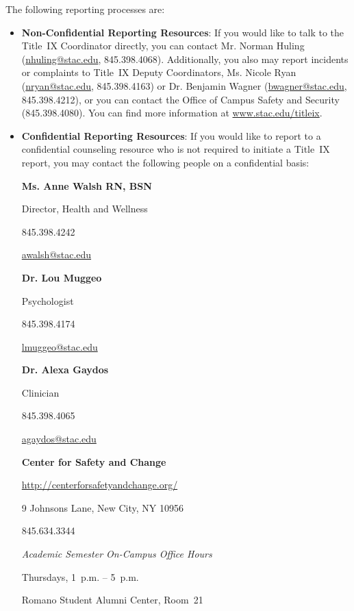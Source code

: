 \documentclass[11pt,letterpaper]{article}
\begin{document}
The following reporting processes are:
	\begin{itemize}
	\item {\bfseries Non-Confidential Reporting Resources}: If you would like to talk to the Title~IX Coordinator directly, you can contact Mr. Norman Huling (\href{mailto:nhuling@stac.edu}{nhuling@stac.edu}, 845.398.4068). Additionally, you also may report incidents or complaints to Title~IX Deputy Coordinators, Ms. Nicole Ryan (\href{mailto:nryan@stac.edu}{nryan@stac.edu}, 845.398.4163) or Dr. Benjamin Wagner (\href{mailto:bwagner@stac.edu}{bwagner@stac.edu}, 845.398.4212), or you can contact the Office of Campus Safety and Security (845.398.4080). You can find more information at \url{www.stac.edu/titleix}.
	
	\item {\bfseries Confidential Reporting Resources}: If you would like to report  to a confidential counseling resource who is not required to initiate a Title~IX report, you may contact the following people on a confidential basis: 
	
	\hspace{0.30cm}\begin{minipage}[t]{0.41\textwidth}
	{\bfseries Ms. Anne Walsh RN, BSN} \par
	Director, Health and Wellness \par
	845.398.4242 \par
	\href{mailto:awalsh@stac.edu}{awalsh@stac.edu}
	\end{minipage}\begin{minipage}[t]{0.30\textwidth}
	{\bfseries Dr. Lou Muggeo} \par
	Psychologist \par
	845.398.4174 \par
	\href{mailto:lmuggeo@stac.edu}{lmuggeo@stac.edu}
        \end{minipage}\begin{minipage}[t]{0.30\textwidth} 
 	{\bfseries Dr. Alexa Gaydos} \par
	Clinician \par
	845.398.4065 \par
	\href{mailto:agaydos@stac.edu}{agaydos@stac.edu}
        \end{minipage} 
        
        \begin{center}
        \begin{minipage}[t]{0.45\textwidth} 
	{\bfseries Center for Safety and Change} \par
	\url{http://centerforsafetyandchange.org/} \par
	9 Johnsons Lane, New City, NY 10956 \par
	845.634.3344 \par \vspace{0.2cm}
	{\itshape Academic Semester On-Campus Office Hours} \par
	Thursdays, 1~p.m. -- 5~p.m. \par
	Romano Student Alumni Center, Room~21
        \end{minipage} 
        \end{center}
\end{itemize} \sectionbreak
\end{document}
